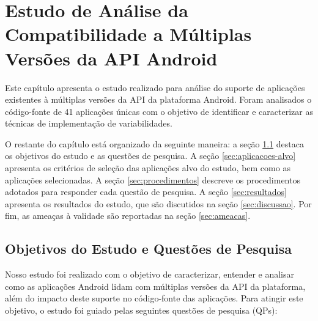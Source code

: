 \chapter{Estudo de Análise da Compatibilidade a Múltiplas Versões da API Android}
\label{ch:estudo}

Este capítulo apresenta o estudo realizado para análise do suporte de aplicações
existentes à múltiplas versões da API da plataforma Android. Foram analisados o
código-fonte de 41 aplicações únicas com o objetivo de identificar e caracterizar
as técnicas de implementação de variabilidades.

O restante do capítulo está organizado da seguinte maneira: 
a seção \ref{sec:objetivos} destaca os objetivos do estudo e as questões de pesquisa.
A seção \ref{sec:aplicacoes-alvo} apresenta os critérios de seleção das aplicações
alvo do estudo, bem como as aplicações selecionadas.
A seção \ref{sec:procedimentos} descreve os procedimentos adotados para responder
cada questão de pesquisa. 
A seção \ref{sec:resultados} apresenta os resultados do estudo, que são discutidos na
seção \ref{sec:discussao}.
Por fim, as ameaças à validade são reportadas na seção \ref{sec:ameacas}.

\section{Objetivos do Estudo e Questões de Pesquisa} \label{sec:objetivos}

Nosso estudo foi realizado com o objetivo de caracterizar, entender e analisar
como as aplicações Android lidam com múltiplas versões da API da plataforma, além
do impacto deste suporte no código-fonte das aplicações. Para atingir este objetivo,
o estudo foi guiado pelas seguintes questões de pesquisa (QPs):

